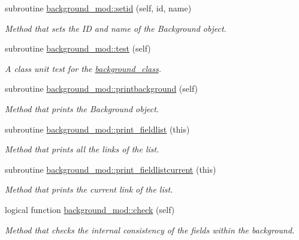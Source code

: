 \begin{DoxyCompactItemize}
subroutine \mbox{\hyperlink{namespacebackground__mod_a4feaccf688558d8590ece4f09c65c977}{background\+\_\+mod\+::setid}} (self, id, name)
\begin{DoxyCompactList}\small\item\em Method that sets the ID and name of the Background object. \end{DoxyCompactList}\item 
subroutine \mbox{\hyperlink{namespacebackground__mod_a3cee95b9b5d3aae83df33334981f2b27}{background\+\_\+mod\+::test}} (self)
\begin{DoxyCompactList}\small\item\em A class \textquotesingle{}unit\textquotesingle{} test for the \mbox{\hyperlink{structbackground__mod_1_1background__class}{background\+\_\+class}}. \end{DoxyCompactList}\item 
subroutine \mbox{\hyperlink{namespacebackground__mod_a8a8f225cffcddb742f22a402155b703f}{background\+\_\+mod\+::printbackground}} (self)
\begin{DoxyCompactList}\small\item\em Method that prints the Background object. \end{DoxyCompactList}\item 
subroutine \mbox{\hyperlink{namespacebackground__mod_acdcc52b4fb298bc145a121f9e8a4b929}{background\+\_\+mod\+::print\+\_\+fieldlist}} (this)
\begin{DoxyCompactList}\small\item\em Method that prints all the links of the list. \end{DoxyCompactList}\item 
subroutine \mbox{\hyperlink{namespacebackground__mod_a2bd18f3830c0667741efd086d36753db}{background\+\_\+mod\+::print\+\_\+fieldlistcurrent}} (this)
\begin{DoxyCompactList}\small\item\em Method that prints the current link of the list. \end{DoxyCompactList}\item 
logical function \mbox{\hyperlink{namespacebackground__mod_af2f517e4aa946491744e012153045bd4}{background\+\_\+mod\+::check}} (self)
\begin{DoxyCompactList}\small\item\em Method that checks the internal consistency of the fields within the background. \end{DoxyCompactList}\end{DoxyCompactItemize}

